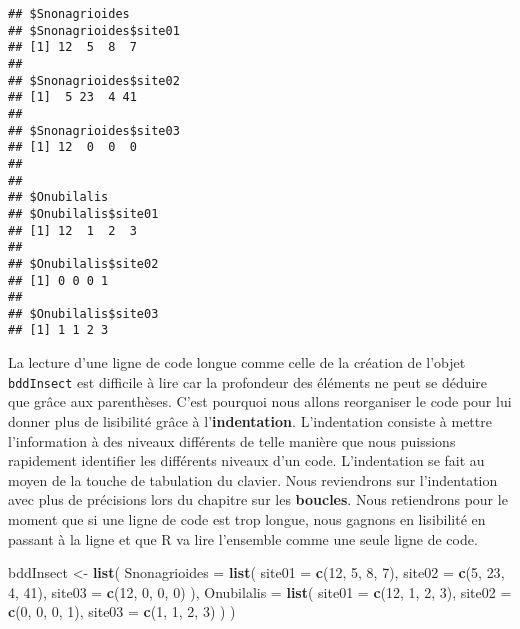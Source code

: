 \documentclass[]{book}
\newenvironment{Shaded}{\begin{snugshade}}{\end{snugshade}}
\newcommand{\KeywordTok}[1]{\textcolor[rgb]{0.13,0.29,0.53}{\textbf{#1}}}
\newcommand{\DataTypeTok}[1]{\textcolor[rgb]{0.13,0.29,0.53}{#1}}
\newcommand{\DecValTok}[1]{\textcolor[rgb]{0.00,0.00,0.81}{#1}}
\newcommand{\StringTok}[1]{\textcolor[rgb]{0.31,0.60,0.02}{#1}}
\newcommand{\NormalTok}[1]{#1}
\theoremstyle{definition}
\theoremstyle{definition}
\theoremstyle{definition}
\theoremstyle{remark}
\begin{document}
\begin{verbatim}
## $Snonagrioides
## $Snonagrioides$site01
## [1] 12  5  8  7
## 
## $Snonagrioides$site02
## [1]  5 23  4 41
## 
## $Snonagrioides$site03
## [1] 12  0  0  0
## 
## 
## $Onubilalis
## $Onubilalis$site01
## [1] 12  1  2  3
## 
## $Onubilalis$site02
## [1] 0 0 0 1
## 
## $Onubilalis$site03
## [1] 1 1 2 3
\end{verbatim}

La lecture d'une ligne de code longue comme celle de la création de
l'objet \texttt{bddInsect} est difficile à lire car la profondeur des
éléments ne peut se déduire que grâce aux parenthèses. C'est pourquoi
nous allons reorganiser le code pour lui donner plus de lisibilité grâce
à l'\textbf{indentation}. L'indentation consiste à mettre l'information
à des niveaux différents de telle manière que nous puissions rapidement
identifier les différents niveaux d'un code. L'indentation se fait au
moyen de la touche de tabulation du clavier. Nous reviendrons sur
l'indentation avec plus de précisions lors du chapitre sur les
\textbf{boucles}. Nous retiendrons pour le moment que si une ligne de
code est trop longue, nous gagnons en lisibilité en passant à la ligne
et que R va lire l'ensemble comme une seule ligne de code.

\begin{Shaded}
\begin{Highlighting}[]
\NormalTok{bddInsect <-}\StringTok{ }\KeywordTok{list}\NormalTok{(}
  \DataTypeTok{Snonagrioides =} \KeywordTok{list}\NormalTok{(}
    \DataTypeTok{site01 =} \KeywordTok{c}\NormalTok{(}\DecValTok{12}\NormalTok{, }\DecValTok{5}\NormalTok{, }\DecValTok{8}\NormalTok{, }\DecValTok{7}\NormalTok{), }
    \DataTypeTok{site02 =} \KeywordTok{c}\NormalTok{(}\DecValTok{5}\NormalTok{, }\DecValTok{23}\NormalTok{, }\DecValTok{4}\NormalTok{, }\DecValTok{41}\NormalTok{), }
    \DataTypeTok{site03 =} \KeywordTok{c}\NormalTok{(}\DecValTok{12}\NormalTok{, }\DecValTok{0}\NormalTok{, }\DecValTok{0}\NormalTok{, }\DecValTok{0}\NormalTok{)}
\NormalTok{  ), }
  \DataTypeTok{Onubilalis =} \KeywordTok{list}\NormalTok{(}
    \DataTypeTok{site01 =} \KeywordTok{c}\NormalTok{(}\DecValTok{12}\NormalTok{, }\DecValTok{1}\NormalTok{, }\DecValTok{2}\NormalTok{, }\DecValTok{3}\NormalTok{), }
    \DataTypeTok{site02 =} \KeywordTok{c}\NormalTok{(}\DecValTok{0}\NormalTok{, }\DecValTok{0}\NormalTok{, }\DecValTok{0}\NormalTok{, }\DecValTok{1}\NormalTok{), }
    \DataTypeTok{site03 =} \KeywordTok{c}\NormalTok{(}\DecValTok{1}\NormalTok{, }\DecValTok{1}\NormalTok{, }\DecValTok{2}\NormalTok{, }\DecValTok{3}\NormalTok{)}
\NormalTok{  )}
\NormalTok{)}
\end{Highlighting}
\end{Shaded}
\end{document}
